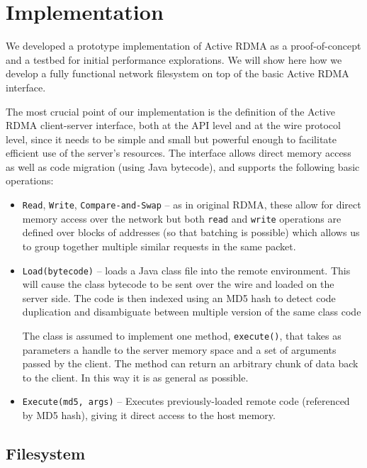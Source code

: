 \documentclass[10pt]{article}
\begin{document}
\section{Implementation}

We developed a prototype implementation of Active RDMA as a
proof-of-concept and a testbed for initial performance
explorations. We will show here how we develop a fully functional
network filesystem on top of the basic Active RDMA interface.

The most crucial point of our implementation is the definition of the
Active RDMA client-server interface, both at the API level and at the
wire protocol level, since it needs to be simple and small but
powerful enough to facilitate efficient use of the server's
resources. The interface allows direct memory access as well as code
migration (using Java bytecode), and supports the following basic
operations:

\begin{itemize}
  \item {\tt Read}, {\tt Write}, {\tt Compare-and-Swap} -- as in
    original RDMA, these allow for direct memory access over the
    network but both {\tt read} and {\tt write} operations are defined
    over blocks of addresses (so that batching is possible) which
    allows us to group together multiple similar requests in the same
    packet.
  \item {\tt Load(bytecode)} -- loads a Java class file into the
    remote environment. This will cause the class bytecode to be sent
    over the wire and loaded on the server side. The code is then
    indexed using an MD5 hash to detect code duplication and
    disambiguate between multiple version of the same class code
    
    The class is assumed to implement one method, {\tt execute()},
    that takes as parameters a handle to the server memory space and a
    set of arguments passed by the client. The method can return an
    arbitrary chunk of data back to the client. In this way it is as
    general as possible.
    
  \item {\tt Execute(md5, args)} -- Executes previously-loaded
    remote code (referenced by MD5 hash), giving it direct access to
    the host memory.
     
\end{itemize}

\subsection{Filesystem}
\end{document}
